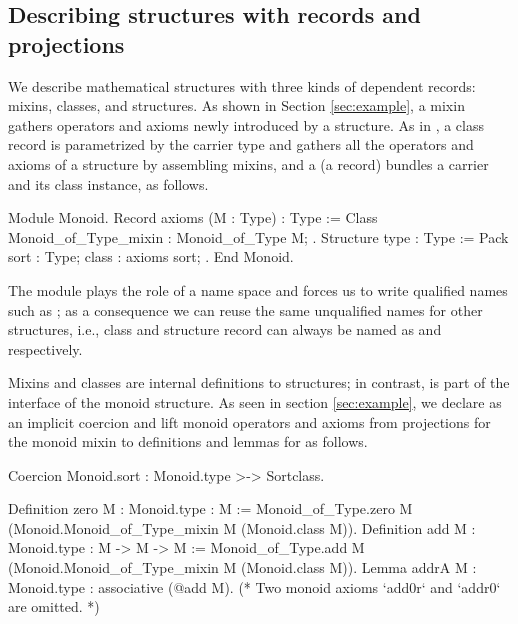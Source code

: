 \documentclass[a4paper,UKenglish,cleveref, autoref]{lipics-v2019}
\newcommand{\mixin}{mixin}
\theoremstyle{implem}
\theoremstyle{implem}
\theoremstyle{command}
\theoremstyle{commands}
\begin{document}
\subsection{Describing structures with records and projections}

We describe mathematical structures with three kinds of dependent records: mixins, classes, and structures.
As shown in Section \ref{sec:example}, a \mixin{} gathers operators and axioms newly introduced by a structure.
As in \cite[Section 2.4]{DBLP:conf/tphol/GarillotGMR09}\cite[Section 2]{KSdraft}, a class record is parametrized by the carrier type  and gathers all the operators and axioms of a structure by assembling mixins, and a  (a record) bundles a carrier and its class instance, as follows.
\begin{coqcode}
Module Monoid.
Record axioms (M : Type) : Type :=
  Class { Monoid_of_Type_mixin : Monoid_of_Type M; }.
Structure type : Type := Pack { sort : Type; class : axioms sort; }.
End Monoid.
\end{coqcode}
The  module plays the role of a name space and forces us to write
qualified names such as ; as a consequence we can reuse the
same unqualified names for other structures, i.e., class and structure record
can always be named as  and  respectively.

Mixins and classes are internal definitions to structures; in contrast,
 is part of the interface of the monoid structure.
As seen in section \ref{sec:example}, we declare  as an
implicit coercion and lift monoid operators and axioms from projections for
the monoid \mixin{} to definitions and lemmas for  as follows.
\begin{coqcode}
Coercion Monoid.sort : Monoid.type >-> Sortclass.

Definition zero {M : Monoid.type} : M :=
  Monoid_of_Type.zero M (Monoid.Monoid_of_Type_mixin M (Monoid.class M)).
Definition add {M : Monoid.type} : M -> M -> M :=
  Monoid_of_Type.add M (Monoid.Monoid_of_Type_mixin M (Monoid.class M)).
Lemma addrA {M : Monoid.type} : associative (@add M).
(* Two monoid axioms `add0r` and `addr0` are omitted. *)
\end{coqcode}
\end{document}
